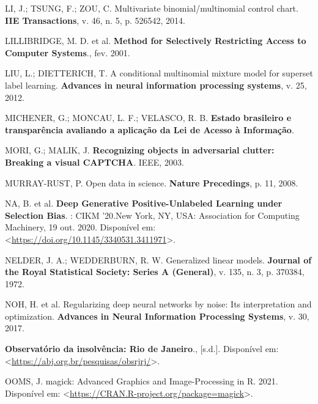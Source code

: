 \documentclass[12pt,twoside,brazilian]{book}
\newlength{\cslhangindent}
\newlength{\cslentryspacingunit} %
\newenvironment{CSLReferences}[2] %
 {%
  \setlength{\parindent}{0pt}
  \ifodd #1
  \let\oldpar\par
  \def\par{\hangindent=\cslhangindent\oldpar}
  \fi
  \setlength{\parskip}{#2\cslentryspacingunit}
 }%
 {}
\begin{document}
\begin{CSLReferences}{0}{1}
\leavevmode{}%
LI, J.; TSUNG, F.; ZOU, C. Multivariate binomial/multinomial control
chart. \textbf{IIE Transactions}, v. 46, n. 5, p. 526542, 2014.

\leavevmode{}%
LILLIBRIDGE, M. D. et al. \textbf{Method for Selectively Restricting
Access to Computer Systems}., fev. 2001.

\leavevmode{}%
LIU, L.; DIETTERICH, T. A conditional multinomial mixture model for
superset label learning. \textbf{Advances in neural information
processing systems}, v. 25, 2012.

\leavevmode{}%
MICHENER, G.; MONCAU, L. F.; VELASCO, R. B. \textbf{Estado brasileiro e
transparência avaliando a aplicação da Lei de Acesso à Informação}.

\leavevmode{}%
MORI, G.; MALIK, J. \textbf{Recognizing objects in adversarial clutter:
Breaking a visual CAPTCHA}. IEEE, 2003.

\leavevmode{}%
MURRAY-RUST, P. Open data in science. \textbf{Nature Precedings}, p. 11,
2008.

\leavevmode{}%
NA, B. et al. \textbf{Deep Generative Positive-Unlabeled Learning under
Selection Bias}. : CIKM '20.New York, NY, USA: Association for Computing
Machinery, 19 out. 2020. Disponível em:
\textless{}\url{https://doi.org/10.1145/3340531.3411971}\textgreater.

\leavevmode{}%
NELDER, J. A.; WEDDERBURN, R. W. Generalized linear models.
\textbf{Journal of the Royal Statistical Society: Series A (General)},
v. 135, n. 3, p. 370384, 1972.

\leavevmode{}%
NOH, H. et al. Regularizing deep neural networks by noise: Its
interpretation and optimization. \textbf{Advances in Neural Information
Processing Systems}, v. 30, 2017.

\leavevmode{}%
\textbf{Observatório da insolvência: Rio de Janeiro}., {[}s.d.{]}.
Disponível em:
\textless{}\url{https://abj.org.br/pesquisas/obsrjrj/}\textgreater.

\leavevmode{}%
OOMS, J. magick: Advanced Graphics and Image-Processing in R. 2021.
Disponível em:
\textless{}\url{https://CRAN.R-project.org/package=magick}\textgreater.


\end{CSLReferences}
\end{document}
